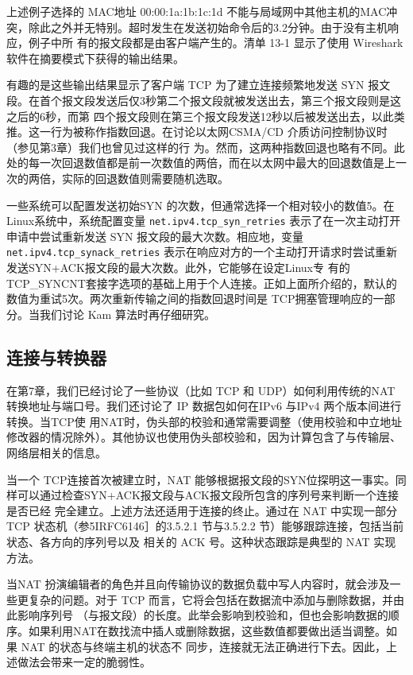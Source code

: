 上述例子选择的 MAC地址 00:00:1a:1b:1c:1d 不能与局域网中其他主机的MAC冲突，除此之外并无特别。超时发生在发送初始命令后的3.2分钟。由于没有主机响应，例子中所
有的报文段都是由客户端产生的。清单 13-1 显示了使用 Wireshark 软件在摘要模式下获得的输出结果。

有趣的是这些输出结果显示了客户端 TCP 为了建立连接频繁地发送 SYN 报文段。在首个报文段发送后仅3秒第二个报文段就被发送出去，第三个报文段则是这之后的6秒，而第
四个报文段则在第三个报文段发送12秒以后被发送出去，以此类推。这一行为被称作指数回退。在讨论以太网CSMA/CD 介质访问控制协议时（参见第3章）我们也曾见过这样的行
为。然而，这两种指数回退也略有不同。此处的每一次回退数值都是前一次数值的两倍，而在以太网中最大的回退数值是上一次的两倍，实际的回退数值则需要随机选取。

一些系统可以配置发送初始SYN 的次数，但通常选择一个相对较小的数值5。在Linux系统中，系统配置变量 \verb|net.ipv4.tcp_syn_retries| 表示了在一次主动打开申请中尝试重新发送
SYN 报文段的最大次数。相应地，变量\verb|net.ipv4.tcp_synack_retries| 表示在响应对方的一个主动打开请求时尝试重新发送SYN+ACK报文段的最大次数。此外，它能够在设定Linux专
有的TCP\_SYNCNT套接字选项的基础上用于个人连接。正如上面所介绍的，默认的数值为重试5次。两次重新传输之间的指数回退时间是 TCP拥塞管理响应的一部分。当我们讨论
Kam 算法时再仔细研究。
\subsection{连接与转换器}
在第7章，我们已经讨论了一些协议（比如 TCP 和 UDP）如何利用传统的NAT 转换地址与端口号。我们还讨论了 IP 数据包如何在IPv6 与IPv4 两个版本间进行转换。当TCP使
用NAT时，伪头部的校验和通常需要调整（使用校验和中立地址修改器的情况除外）。其他协议也使用伪头部校验和，因为计算包含了与传输层、网络层相关的信息。

当一个 TCP连接首次被建立时，NAT 能够根据报文段的SYN位探明这一事实。同样可以通过检查SYN+ACK报文段与ACK报文段所包含的序列号来判断一个连接是否已经
完全建立。上述方法还适用于连接的终止。通过在 NAT 中实现一部分TCP 状态机（参5IRFC6146］的3.5.2.1 节与3.5.2.2 节）能够跟踪连接，包括当前状态、各方向的序列号以及
相关的 ACK 号。这种状态跟踪是典型的 NAT 实现方法。

当NAT 扮演编辑者的角色并且向传输协议的数据负载中写人内容时，就会涉及一些更复杂的问题。对于 TCP 而言，它将会包括在数据流中添加与删除数据，并由此影响序列号
（与报文段）的长度。此举会影响到校验和，但也会影响数据的顺序。如果利用NAT在数找流中插人或删除数据，这些数值都要做出适当调整。如果 NAT 的状态与终端主机的状态不
同步，连接就无法正确进行下去。因此，上述做法会带来一定的脆弱性。

